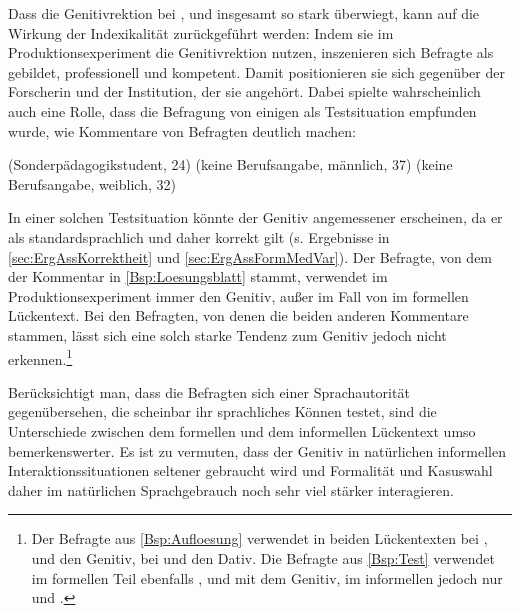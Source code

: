 Dass die Genitivrektion bei \wegen, \waehrend{} und \dank{} insgesamt so stark überwiegt, kann auf die Wirkung der Indexikalität zurückgeführt werden: 
Indem sie im Produktionsexperiment die Genitivrektion nutzen, inszenieren sich Befragte als gebildet, professionell und kompetent. 
Damit positionieren sie sich gegenüber der Forscherin und der Institution, der sie angehört. 
Dabei spielte wahrscheinlich auch eine Rolle, dass die Befragung von einigen als Testsituation empfunden wurde, wie Kommentare von Befragten deutlich machen:  
\begin{exe}
\ex {} (Sonderpädagogikstudent, 24) \label{Bsp:Loesungsblatt}
\ex {} (keine Berufsangabe, männlich, 37) \label{Bsp:Aufloesung}
\ex {} (keine Berufsangabe, weiblich, 32) \label{Bsp:Test}
\end{exe}
In einer solchen Testsituation könnte der Genitiv angemessener erscheinen, da er als standardsprachlich und daher korrekt gilt (s. Ergebnisse in \autoref{sec:ErgAssKorrektheit} und \autoref{sec:ErgAssFormMedVar}). 
Der Befragte, von dem der Kommentar in \autoref{Bsp:Loesungsblatt} stammt, verwendet im Produktionsexperiment immer den Genitiv, außer im Fall von  im formellen Lückentext. 
Bei den Befragten, von denen die beiden anderen Kommentare stammen, lässt sich eine solch starke Tendenz zum Genitiv jedoch nicht erkennen.\footnote{Der Befragte aus \autoref{Bsp:Aufloesung} verwendet in beiden Lückentexten bei \wegen{}, \waehrend{} und \dank{} den Genitiv, bei \gegenueber{} und  den Dativ. Die Befragte aus \autoref{Bsp:Test} verwendet im formellen Teil ebenfalls \wegen{}, \waehrend{} und \dank{} mit dem Genitiv, im informellen jedoch nur \wegen{} und \waehrend{}.}

Berücksichtigt man, dass die Befragten sich einer Sprachautorität gegenübersehen, die scheinbar ihr sprachliches Können testet, sind die Unterschiede zwischen dem formellen und dem informellen Lückentext umso bemerkenswerter. 
Es ist zu vermuten, dass der Genitiv in natürlichen informellen Interaktionssituationen seltener gebraucht wird und Formalität und Kasuswahl daher im natürlichen Sprachgebrauch noch sehr viel stärker interagieren. 

